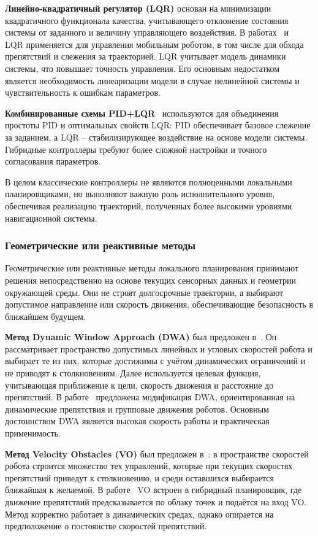 \documentclass[a4paper,12pt]{extarticle}
\begin{document}
    \textbf{Линейно-квадратичный регулятор (LQR)} основан на минимизации квадратичного функционала качества,
    учитывающего отклонение состояния системы от заданного и величину управляющего воздействия.
    В работах~\cite{lqr} и~\cite{lqr2} LQR применяется для управления мобильным роботом,
    в том числе для обхода препятствий и слежения за траекторией.
    LQR учитывает модель динамики системы,
    что повышает точность управления.
    Его основным недостатком является необходимость линеаризации модели в случае нелинейной системы и чувствительность к ошибкам параметров.

    \textbf{Комбинированные схемы PID+LQR}~\cite{pid_lqr} используются для объединения простоты PID и оптимальных свойств LQR: PID обеспечивает базовое слежение за заданием, а LQR -- стабилизирующее воздействие на основе модели системы.
    Гибридные контроллеры требуют более сложной настройки и точного согласования параметров.

    В целом классические контроллеры не являются полноценными локальными планировщиками,
    но выполняют важную роль исполнительного уровня, обеспечивая реализацию траекторий,
    полученных более высокими уровнями навигационной системы.

    \subsubsection{Геометрические или реактивные методы}
    Геометрические или реактивные методы локального планирования принимают решения непосредственно
    на основе текущих сенсорных данных и геометрии окружающей среды.
    Они не строят долгосрочные траектории, а выбирают допустимое направление или скорость движения,
    обеспечивающие безопасность в ближайшем будущем.

    \textbf{Метод Dynamic Window Approach (DWA)} был предложен в~\cite{dwa_origin}.
    Он рассматривает пространство допустимых линейных и угловых скоростей робота и выбирает те из них,
    которые достижимы с учётом динамических ограничений и не приводят к столкновениям.
    Далее используется целевая функция, учитывающая приближение к цели,
    скорость движения и расстояние до препятствий.
    В работе~\cite{dwa_new} предложена модификация DWA, ориентированная на динамические препятствия и групповые движения роботов.
    Основным достоинством DWA является высокая скорость работы и практическая применимость.

    \textbf{Метод Velocity Obstacles (VO)} был предложен в~\cite{vo_origin}: в пространстве скоростей робота строится множество тех управлений, которые при текущих скоростях препятствий приведут к столкновению, и среди оставшихся выбирается ближайшая к желаемой.
    В работе~\cite{vo_new} VO встроен в гибридный планировщик, где движение препятствий предсказывается по облаку точек и подаётся на вход VO.
    Метод корректно работает в динамических средах, однако опирается на предположение о постоянстве скоростей препятствий.
\end{document}
